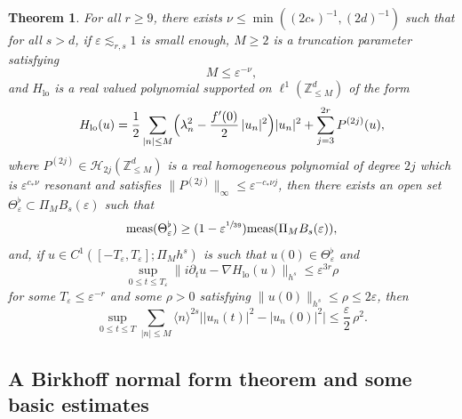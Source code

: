 \documentclass[JEP,XML,SOM,Unicode,published]{cedram}
\theoremstyle{plain}
\newtheorem{theorem}{Theorem}[section]
\theoremstyle{definition}
\DeclareMathOperator{\lo}{lo}
\newcommand{\1}{\mathbf{1}}
\let\epsilon\varepsilon
\begin{document}
\begin{theorem}
\label{thm:main_low}
For all $r\geq 9$, there exists $\nu \leq \min((2c_\ast)^{-1},(2d)^{-1})$ such that for all $s>d$, if $\varepsilon \lesssim_{r,s} 1$ is small enough, $M\geq 2$ is a truncation parameter satisfying
\[
M \leq \varepsilon^{-\nu},
\]
and $H_{\lo}$ is a real valued polynomial supported on $\ell^1(\mathbb{Z}^d_{\leq M})$ of the form
\begin{equation}
\label{eq:Hlo-0}
H_{\lo}(u) = \frac12 \sum_{|n|\leq M} \Bigl(\lambda_n^2 - \frac{f'(0)}2\, |u_n|^2\Bigl) |u_n|^2 + \sum_{j=3}^{2r} P^{(2j)}(u),
\end{equation}
where $P^{(2j)} \in \mathcal{H}_{2j}(\mathbb{Z}^d_{\leq M})$ is a real homogeneous polynomial of degree $2j$ which is
$\varepsilon^{c_* \nu}$ resonant and satisfies $\| P^{(2j)} \|_{\infty} \leq \varepsilon^{- c_* \nu j }$, then
there exists an open set $\Theta_{\varepsilon}^\flat \subset \Pi_{M} B_s(\varepsilon)$ such that
\begin{equation}
\label{eq:density}
\mathrm{meas}(\Theta_{\varepsilon}^\flat) \geq (1 - \varepsilon^{\sfrac{1}{39}})\mathrm{meas}(\Pi_{M} B_s(\varepsilon)),
\end{equation}
and, if $u \in C^1([-T_{\epsilon},T_{\epsilon}];\Pi_M h^s)$ is such that $u(0) \in \Theta_{\varepsilon}^\flat$ and
\[
\sup_{0\leq t \leq T_{\epsilon}} \| i\partial_t u - \nabla H_{\lo} (u) \|_{h^s} \leq \varepsilon^{3r}\rho
\]
for some $T_{\epsilon}\leq \varepsilon^{- r}$ and some $\rho>0$ satisfying $\|u(0)\|_{h^s} \leq \rho \leq 2 \varepsilon$, then
\begin{equation}
\label{eq:boo-u}
\sup_{0\leq t \leq T} \sum_{|n|\leq M} \langle n\rangle^{2s} \big| |u_n(t)|^2 - |u_n(0)|^2 \big|\leq \frac{\varepsilon }2\, \rho^2.
\end{equation}
\end{theorem}

\subsection{A Birkhoff normal form theorem and some basic estimates}
\end{document}
